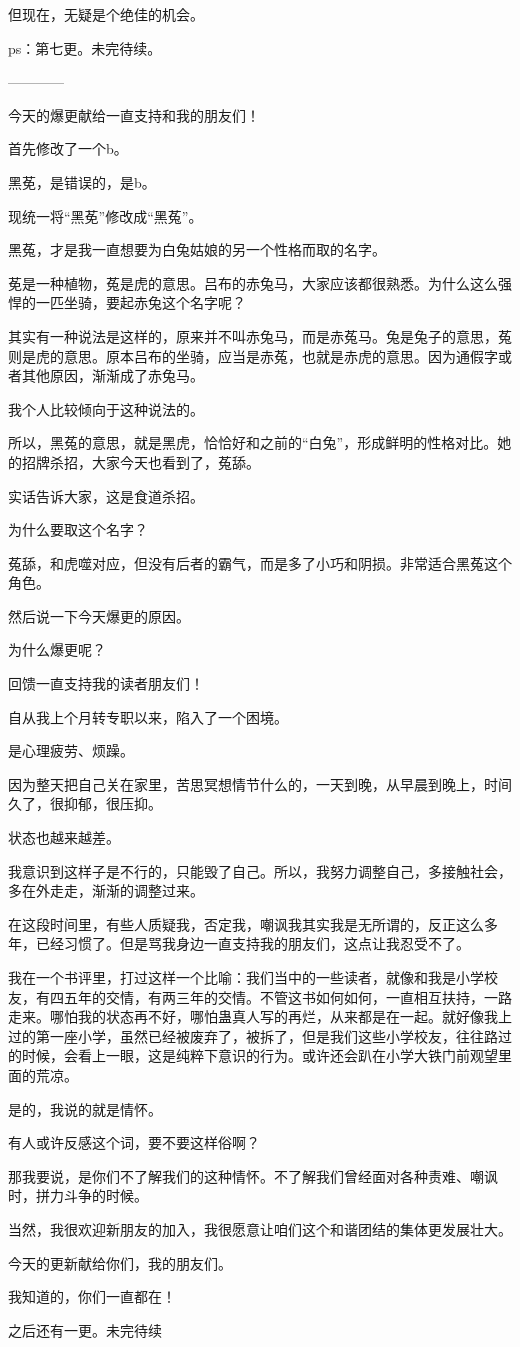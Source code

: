 \begin{this_body}
但现在，无疑是个绝佳的机会。

ps：第七更。未完待续。

------------

今天的爆更献给一直支持和我的朋友们！

首先修改了一个b。

黑莬，是错误的，是b。

现统一将“黑莬”修改成“黑菟”。

黑菟，才是我一直想要为白兔姑娘的另一个性格而取的名字。

莬是一种植物，菟是虎的意思。吕布的赤兔马，大家应该都很熟悉。为什么这么强悍的一匹坐骑，要起赤兔这个名字呢？

其实有一种说法是这样的，原来并不叫赤兔马，而是赤菟马。兔是兔子的意思，菟则是虎的意思。原本吕布的坐骑，应当是赤菟，也就是赤虎的意思。因为通假字或者其他原因，渐渐成了赤兔马。

我个人比较倾向于这种说法的。

所以，黑菟的意思，就是黑虎，恰恰好和之前的“白兔”，形成鲜明的性格对比。她的招牌杀招，大家今天也看到了，菟舔。

实话告诉大家，这是食道杀招。

为什么要取这个名字？

菟舔，和虎噬对应，但没有后者的霸气，而是多了小巧和阴损。非常适合黑菟这个角色。

然后说一下今天爆更的原因。

为什么爆更呢？

回馈一直支持我的读者朋友们！

自从我上个月转专职以来，陷入了一个困境。

是心理疲劳、烦躁。

因为整天把自己关在家里，苦思冥想情节什么的，一天到晚，从早晨到晚上，时间久了，很抑郁，很压抑。

状态也越来越差。

我意识到这样子是不行的，只能毁了自己。所以，我努力调整自己，多接触社会，多在外走走，渐渐的调整过来。

在这段时间里，有些人质疑我，否定我，嘲讽我其实我是无所谓的，反正这么多年，已经习惯了。但是骂我身边一直支持我的朋友们，这点让我忍受不了。

我在一个书评里，打过这样一个比喻：我们当中的一些读者，就像和我是小学校友，有四五年的交情，有两三年的交情。不管这书如何如何，一直相互扶持，一路走来。哪怕我的状态再不好，哪怕蛊真人写的再烂，从来都是在一起。就好像我上过的第一座小学，虽然已经被废弃了，被拆了，但是我们这些小学校友，往往路过的时候，会看上一眼，这是纯粹下意识的行为。或许还会趴在小学大铁门前观望里面的荒凉。

是的，我说的就是情怀。

有人或许反感这个词，要不要这样俗啊？

那我要说，是你们不了解我们的这种情怀。不了解我们曾经面对各种责难、嘲讽时，拼力斗争的时候。

当然，我很欢迎新朋友的加入，我很愿意让咱们这个和谐团结的集体更发展壮大。

今天的更新献给你们，我的朋友们。

我知道的，你们一直都在！

之后还有一更。未完待续

\end{this_body}

